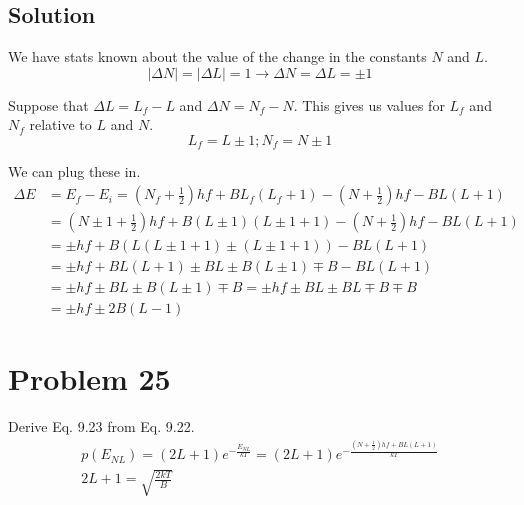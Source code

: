 \documentclass[12pt]{report}
\newcommand{\e}[1]{e^{#1}}
\begin{document}
    \subsection{Solution}
        We have stats known about the value of the change in the constants $N$ and $L$.
        \begin{equation}
            \left| \Delta N \right| = \left| \Delta L \right| = 1 \to \Delta N = \Delta L = \pm 1
        \end{equation}

        Suppose that $\Delta L = L_f - L$ and $\Delta N = N_f - N$. 
        This gives us values for $L_f$ and $N_f$ relative to $L$ and $N$. 
        \begin{equation}
            L_f = L \pm 1; N_f = N \pm 1
        \end{equation}

        We can plug these in.
        \begin{align}
            \Delta E    &=  E_f - E_i
                =   (N_f + \frac{1}{2})hf + BL_f(L_f + 1) - (N + \frac{1}{2})hf - BL(L + 1)\\
                &=  (N \pm 1 + \frac{1}{2})hf + B(L \pm 1)(L \pm 1 + 1) - (N + \frac{1}{2})hf - BL(L + 1)\\
                &=  \pm hf + B(L(L \pm 1 + 1) \pm (L \pm 1 + 1)) - BL(L + 1)\\
                &=  \pm hf + BL(L + 1) \pm BL \pm B(L \pm 1) \mp B - BL(L + 1)\\
                &=  \pm hf \pm BL \pm B(L \pm 1) \mp B
                =   \pm hf \pm BL \pm BL \mp B \mp B\\
                &=  \boxed{\pm hf \pm 2B(L - 1)}
        \end{align}
    \pagebreak

\section{Problem 25}
    Derive Eq. 9.23 from Eq. 9.22.
    \begin{gather}\tag{9.22}
        p(E_{NL}) = (2L + 1)\e{-\frac{E_{NL}}{kT}} = (2L + 1)\e{-\frac{(N + \frac{1}{2})hf + BL(L + 1)}{kT}}\\
        \tag{9.23}
        2L + 1 = \sqrt{\frac{2kT}{B}}
    \end{gather}
\end{document}
